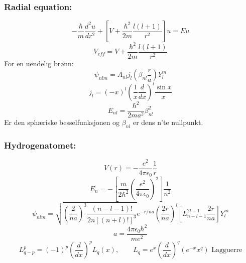 \documentclass[a4paper,norsk, 10pt]{article}
\begin{document}
\subsubsection{Radial equation:}
\begin{equation}
-\frac{\hbar}{m}\frac{d^2u}{dr^2} + \left[V + \frac{\hbar^2}{2m}\frac{l(l+1)}{r^2}\right]u = Eu
\end{equation}
\begin{equation}
V_{eff} = V + \frac{\hbar^2}{2m}\frac{l(l+1)}{r^2}
\end{equation}
For en uendelig brønn:
\begin{equation}
\psi_{nlm} = A_{nl}j_l(\beta_{nl}\frac{r}{a})Y_l^m
\end{equation}
\begin{equation}
j_l = (-x)^l\left(\frac{1}{x}\frac{d}{dx}\right)^l\frac{\sin x}{x}
\end{equation}
\begin{equation}
E_{nl}= \frac{\hbar^2}{2ma^2}\beta_{nl}^2
\end{equation}
Er den sphæriske besselfunksjonen og $\beta_{nl}$ er dens n'te nullpunkt.
\subsubsection{Hydrogenatomet:}
\begin{equation}
V(r) = -\frac{e^2}{4\pi \epsilon_0}\frac{1}{r}
\end{equation}
\begin{equation}
E_n = -\left[\frac{m}{2\hbar^2}\left(\frac{e^2}{4\pi \epsilon_0}\right)^2\right]\frac{1}{n^2}
\end{equation}
\begin{equation}
\psi_{nlm} = \sqrt{\left(\frac{2}{na}\right)^3\frac{(n-l-1)!}{2n[(n+l)!]^3}}e^{-r/na}\left(\frac{2r}{na}\right)^l\left[L_{n-l-1}^{2l+1}\frac{2r}{na}\right]Y_l^m
\end{equation}
\begin{equation}
a = \frac{4\pi\epsilon_0\hbar^2}{me^2}
\end{equation}
\begin{equation}
L^p_{q-p}= (-1)^p\left(\frac{d}{dx}\right)^pL_q(x), \qquad L_q = e^x \left(\frac{d}{dx}\right)^q(e^{-x}x^q) \text{ Lagguerre}
\end{equation}
\end{document}
